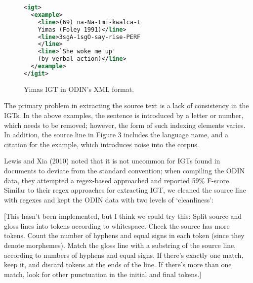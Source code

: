 \begin{figure}
\begin{lstlisting}[language=XML]
<igt>
  <example>
    <line>(69) na-Na-tmi-kwalca-t 
    Yimas (Foley 1991)</line>
    <line>3sgA-1sgO-say-rise-PERF
    </line>
    <line>`She woke me up' 
    (by verbal action)</line>
  </example>
</igit>
\end{lstlisting} 
\smallskip
\caption{Yimas IGT in ODIN's XML format.}\label{fig:odin_yimas_xml}
\end{figure}





\noindent The primary problem in extracting the source text is a lack of consistency in the IGTs. In the above examples, the sentence is introduced by a letter or number, which needs to be removed; however, the form of such indexing elements varies. In addition, the source line in Figure 3 includes the language name, and a citation for the example, which introduces noise into the corpus.

Lewis and Xia (2010) noted that it is not uncommon for IGTs found in documents to deviate from the standard convention; when compiling the ODIN data, they attempted a regex-based approached and reported 59\% F-score. Similar to their regex approaches for extracting IGT, we cleaned the source line with regexes and kept the ODIN data with two levels of `cleanliness':

[This hasn't been implemented, but I think we could try this: Split source and gloss lines into tokens according to whitespace. Check the source has more tokens. Count the number of hyphens and equal signs in each token (since they denote morphemes). Match the gloss line with a substring of the source line, according to numbers of hyphens and equal signs. If there's exactly one match, keep it, and discard tokens at the ends of the line. If there's more than one match, look for other punctuation in the initial and final tokens.]


